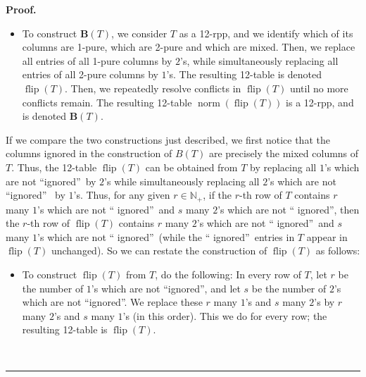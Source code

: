 \documentclass[numbers=enddot,12pt,final,onecolumn,notitlepage]{scrartcl}%
\theoremstyle{definition}
\newenvironment{proof}[1][Proof]{\noindent\textbf{#1.} }{\ \rule{0.5em}{0.5em}}
\begin{document}
\begin{proof}
\begin{itemize}
\item To construct $\mathbf{B}\left(  T\right)  $, we consider $T$ as a
12-rpp, and we identify which of its columns are 1-pure, which are 2-pure and
which are mixed. Then, we replace all entries of all 1-pure columns by $2$'s,
while simultaneously replacing all entries of all 2-pure columns by $1$'s. The
resulting 12-table is denoted $\operatorname*{flip}\left(  T\right)  $. Then,
we repeatedly resolve conflicts in $\operatorname*{flip}\left(  T\right)  $
until no more conflicts remain. The resulting 12-table $\operatorname*{norm}%
\left(  \operatorname*{flip}\left(  T\right)  \right)  $ is a 12-rpp, and is
denoted $\mathbf{B}\left(  T\right)  $.
\end{itemize}

If we compare the two constructions just described, we first notice that the
columns ignored in the construction of $B\left(  T\right)  $ are precisely the
mixed columns of $T$. Thus, the 12-table $\operatorname*{flip}\left(
T\right)  $ can be obtained from $T$ by replacing all $1$'s which are not
\textquotedblleft ignored\textquotedblright\ by $2$'s while simultaneously
replacing all $2$'s which are not \textquotedblleft ignored\textquotedblright%
\ by $1$'s. Thus, for any given $r\in\mathbb{N}_{+}$, if the $r$-th row of $T$
contains $r$ many $1$'s which are not \textquotedblleft
ignored\textquotedblright\ and $s$ many $2$'s which are not \textquotedblleft
ignored\textquotedblright, then the $r$-th row of $\operatorname*{flip}\left(
T\right)  $ contains $r$ many $2$'s which are not \textquotedblleft
ignored\textquotedblright\ and $s$ many $1$'s which are not \textquotedblleft
ignored\textquotedblright\ (while the \textquotedblleft
ignored\textquotedblright\ entries in $T$ appear in $\operatorname*{flip}%
\left(  T\right)  $ unchanged). So we can restate the construction of
$\operatorname*{flip}\left(  T\right)  $ as follows:

\begin{itemize}
\item To construct $\operatorname*{flip}\left(  T\right)  $ from $T$, do the
following: In every row of $T$, let $r$ be the number of $1$'s which are not
\textquotedblleft ignored\textquotedblright, and let $s$ be the number of
$2$'s which are not \textquotedblleft ignored\textquotedblright. We replace
these $r$ many $1$'s and $s$ many $2$'s by $r$ many $2$'s and $s$ many $1$'s
(in this order). This we do for every row; the resulting 12-table is
$\operatorname*{flip}\left(  T\right)  $.
\end{itemize}


\end{proof}
\end{document}
